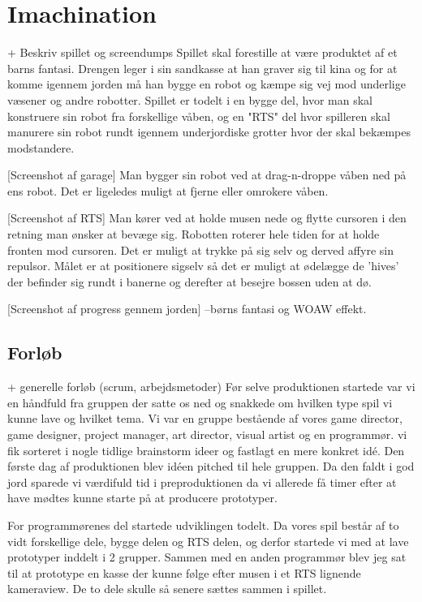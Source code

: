 \section{Imachination}
                + Beskriv spillet og screendumps
Spillet skal forestille at være produktet af et barns fantasi. Drengen leger i sin sandkasse at han graver sig til kina og for at komme igennem jorden må han bygge en robot og kæmpe sig vej mod underlige væsener og andre robotter.
Spillet er todelt i en bygge del, hvor man skal konstruere sin robot fra forskellige våben, og en "RTS" del hvor spilleren skal manurere sin robot rundt igennem underjordiske grotter hvor der skal bekæmpes modstandere.

[Screenshot af garage]
Man bygger sin robot ved at drag-n-droppe våben ned på ens robot. Det er ligeledes muligt at fjerne eller omrokere våben.

[Screenshot af RTS]
Man kører ved at holde musen nede og flytte cursoren i den retning man ønsker at bevæge sig. Robotten roterer hele tiden for at holde fronten mod cursoren. Det er muligt at trykke på sig selv og derved affyre sin repulsor. Målet er at positionere sigselv så det er muligt at ødelægge de 'hives' der befinder sig rundt i banerne og derefter at besejre bossen uden at dø.

[Screenshot af progress gennem jorden]
--børns fantasi og WOAW effekt.

\subsection{Forløb}

                + generelle forløb (scrum, arbejdsmetoder)
Før selve produktionen startede var vi en håndfuld fra gruppen der satte os ned og snakkede om hvilken type spil vi kunne lave og hvilket tema. Vi var en gruppe bestående af vores game director, game designer, project manager, art director, visual artist og en programmør. vi fik sorteret i nogle tidlige brainstorm ideer og fastlagt en mere konkret idé. Den første dag af produktionen blev idéen pitched til hele gruppen. Da den faldt i god jord sparede vi værdifuld tid i preproduktionen da vi allerede få timer efter at have mødtes kunne starte på at producere prototyper.

For programmørenes del startede udviklingen todelt. Da vores spil består af to vidt forskellige dele, bygge delen og RTS delen, og derfor startede vi med at lave prototyper inddelt i 2 grupper. Sammen med en anden programmør blev jeg sat til at prototype en kasse der kunne følge efter musen i et RTS lignende kameraview. De to dele skulle så senere sættes sammen i spillet.

